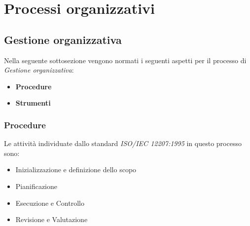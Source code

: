 \section{Processi organizzativi}

\subsection{Gestione organizzativa}
Nella seguente sottosezione vengono normati i seguenti aspetti per il 
processo di \textit{Gestione organizzativa}:
\begin{itemize}
    \item \textbf{Procedure}
    \item \textbf{Strumenti}
\end{itemize}

\subsubsection{Procedure}
Le attività individuate dallo standard \textit{ISO/IEC 12207:1995} in questo processo sono:
\begin{itemize}
    \item Inizializzazione e definizione dello scopo
    \item Pianificazione
    \item Esecuzione e Controllo
    \item Revisione e Valutazione
\end{itemize}

